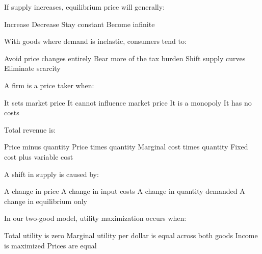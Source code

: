 \documentclass[12pt]{exam}
\begin{document}
\begin{questions}
    \begin{mcquestion}[2]
        If supply increases, equilibrium price will generally:
        \begin{choices}
            \choice Increase
            \CorrectChoice Decrease
            \choice Stay constant
            \choice Become infinite
        \end{choices}
    \end{mcquestion}

    \begin{mcquestion}[2]
        With goods where demand is inelastic, consumers tend to:
        \begin{choices}
            \choice Avoid price changes entirely
            \CorrectChoice Bear more of the tax burden
            \choice Shift supply curves
            \choice Eliminate scarcity
        \end{choices}
    \end{mcquestion}

    \begin{mcquestion}[2]
        A firm is a price taker when:
        \begin{choices}
            \choice It sets market price
            \CorrectChoice It cannot influence market price
            \choice It is a monopoly
            \choice It has no costs
        \end{choices}
    \end{mcquestion}

    \begin{mcquestion}[2]
        Total revenue is:
        \begin{choices}
            \choice Price minus quantity
            \CorrectChoice Price times quantity
            \choice Marginal cost times quantity
            \choice Fixed cost plus variable cost
        \end{choices}
    \end{mcquestion}

    \begin{mcquestion}[2]
        A shift in supply is caused by:
        \begin{choices}
            \choice A change in price
            \CorrectChoice A change in input costs
            \choice A change in quantity demanded
            \choice A change in equilibrium only
        \end{choices}
    \end{mcquestion}

    \begin{mcquestion}[2]
        In our two-good model, utility maximization occurs when:
        \begin{choices}
            \choice Total utility is zero
            \CorrectChoice Marginal utility per dollar is equal across both goods
            \choice Income is maximized
            \choice Prices are equal
        \end{choices}
    \end{mcquestion}


\end{questions}
\end{document}
